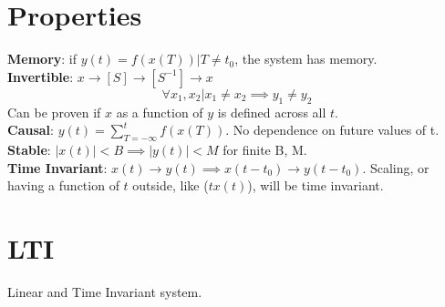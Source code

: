 \documentclass[twocolumn]{article}
\begin{document}
\section*{Properties}
\textbf{Memory}: if $y(t) = f(x(T)) | T\neq t_0$, the system has memory.\\
\textbf{Invertible}: $x\rightarrow [S]\rightarrow [S^{-1}]\rightarrow x$
\begin{equation*}
    \forall x_1, x_2 | x_1\neq x_2 \implies y_1\neq y_2 
\end{equation*}
Can be proven if $x$ as a function of $y$ is defined across all $t$.\\
\textbf{Causal}: $y(t) = \sum_{T=-\infty}^{t} f(x(T))$. No dependence on future values of t.\\
\textbf{Stable}: $|x(t)|<B \implies |y(t)|<M$ for finite B, M.\\
\textbf{Time Invariant}: $x(t) \rightarrow y(t) \implies x(t-t_0) \rightarrow y(t-t_0)$.
Scaling, or having a function of $t$ outside, like ($tx(t)$), will be time invariant.
\section*{LTI}
Linear and Time Invariant system.
\end{document}
